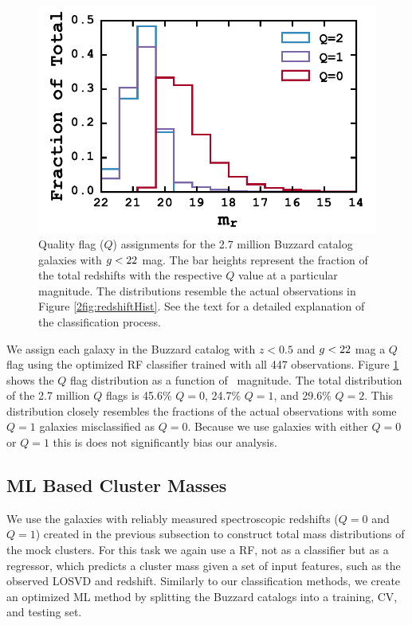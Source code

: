 \begin{figure}[t]
	\begin{center}
		\includegraphics[width=\textwidth]{figures2/buzzardQHist.pdf}
	\end{center}
	\caption[Quality flag assignments for the 2.7 million Buzzard catalog galaxies]{Quality flag ($Q$) assignments for the 2.7 million Buzzard catalog galaxies with $\hbox{$g$}< 22$ mag. The bar heights represent the fraction of the total redshifts with the respective $Q$ value at a particular magnitude. The distributions resemble the actual observations in Figure \ref{2fig:redshiftHist}. See the text for a detailed explanation of the classification process.} 
	\label{2fig:buzzardHist} 
\end{figure}

We assign each galaxy in the Buzzard catalog with $z<0.5$ and $\hbox{$g$}< 22$ mag a $Q$ flag using the optimized RF classifier trained with all 447 observations. Figure \ref{2fig:buzzardHist} shows the $Q$ flag distribution as a function of \sdssr\ magnitude. The total distribution of the 2.7 million $Q$ flags is 45.6\% $Q=0$, 24.7\% $Q=1$, and 29.6\% $Q=2$. This distribution closely resembles the fractions of the actual observations with some $Q=1$ galaxies misclassified as $Q=0$. Because we use galaxies with either $Q=0$ or $Q=1$ this is does not significantly bias our analysis.

\subsection{ML Based Cluster Masses}\label{2sec:ML based cluster masses}
We use the galaxies with reliably measured spectroscopic redshifts ($Q=0$ and $Q=1$) created in the previous subsection to construct total mass distributions of the mock clusters. For this task we again use a RF, not as a classifier but as a regressor, which predicts a cluster mass given a set of input features, such as the observed LOSVD and redshift. Similarly to our classification methods, we create an optimized ML method by splitting the Buzzard catalogs into a training, CV, and testing set. 

